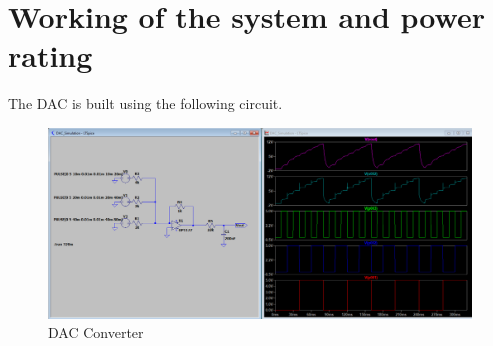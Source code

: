 \documentclass[oneside]{book}
\begin{document}
\newpage
\chapter{Working of the system and power rating}
The DAC is built using the following circuit.
\begin{figure}[htbp]
    \centering
    \includegraphics[width=1\textwidth]{figs/DAC Converter with Lowpass Filter - LTSpice.png}
    \caption{DAC Converter}
    \label{SPICE}
\end{figure} \\
\bigskip
\end{document}
